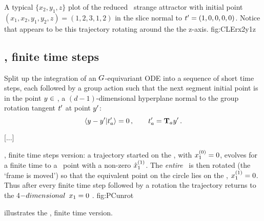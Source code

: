 {{    }%

{}{
A typical $\{x_2,y_1,z\}$ plot of the reduced \cLf\ strange attractor
with initial point
$(x_1, x_2, y_1, y_2, z) = (1, 2, 3, 1, 2)$ in the slice normal to $t'_{}=(1,0,0,0,0)$. Notice that  appears to be this trajectory rotating around the the z-axis.
    }{fig:CLErx2y1z}


	\ifarticle
	\else
	
\subsection{\Mslices, finite time steps}
\label{sect:MovFrame}


Split up the integration of an $G$-equivariant ODE into
a sequence of short time steps, each followed by a group action
such that the next segment initial point is in the point
$y \in$ {\slice}, a $(d\!-\!1)$-dimensional hyperplane
normal to the group rotation tangent $t'_{}$ at point
${y'}$:
\[ %
\dotProd{\sspRed - \slicep}{\sliceTan{a}}=0
    \,,\qquad
\sliceTan{a} = \Lg_a \slicep
\,.
\] %

[...]

{}{
{\Mslices}, finite time steps version: a
trajectory started on the \slice, with $x_1^{(0)}
=0$, evolves for a finite time to a \statesp\ point with a
non-zero $\hat{x}_1^{(1)}$. The {\em entire} \statesp\ is then
rotated (the `frame is moved') so that the equivalent point
on the circle lies on the \slice, $x_1^{(1)} =0$.
Thus after every finite time step followed by a rotation the
trajectory returns to the 4$-dimensional$ $x_1 =0$
\reducedsp.
}
{fig:PCunrot}

 illustrates the {\mslices},
finite time version.

}
